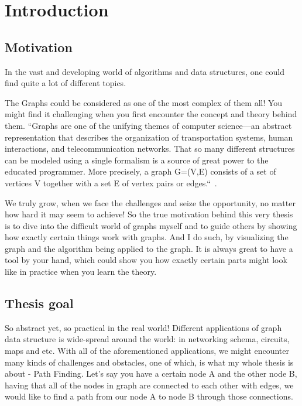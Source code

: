 \chapter{Introduction} %
\label{ch:intro}

\section{Motivation}

In the vast and developing world of algorithms and data structures, one could find quite a lot of different topics. 

The Graphs could be considered as one of the most complex of them all! You might find it challenging when you first encounter the concept and theory behind them. ``Graphs are one of the unifying themes of computer science—an abstract representation that describes the organization of transportation systems, human interactions, and telecommunication networks. That so many different structures can be modeled using a single formalism is a source of great power to the educated programmer. More precisely, a graph G=(V,E) consists of a set of vertices V together with a set E of vertex pairs or edges.``~\cite{skiena-algorithm-design}. 

We truly grow, when we face the challenges and seize the opportunity, no matter how hard it may seem to achieve! So the true motivation behind this very thesis is to dive into the difficult world of graphs myself and to guide others by showing how exactly certain things work with graphs. And I do such, by visualizing the graph and the algorithm being applied to the graph. It is always great to have a tool by your hand, which could show you how exactly certain parts might look like in practice when you learn the theory. 

\section{Thesis goal}

So abstract yet, so practical in the real world! Different applications of graph data structure is wide-spread around the world: in networking schema, circuits, maps and etc. With all of the aforementioned applications, we might encounter many kinds of challenges and obstacles, one of which, is what my whole thesis is about - Path Finding. Let's say you have a certain node A and the other node B, having that all of the nodes in graph are connected to each other with edges, we would like to find a path from our node A to node B through those connections. 

